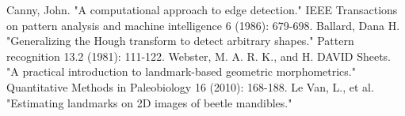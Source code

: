 \documentclass[twoside,twocolumn,10pt]{article}
\begin{document}

\begin{thebibliography}{99}
\label{references}
 Canny, John. "A computational approach to edge detection." IEEE Transactions on pattern analysis and machine intelligence 6 (1986): 679-698.
 Ballard, Dana H. "Generalizing the Hough transform to detect arbitrary shapes." Pattern recognition 13.2 (1981): 111-122.
 Webster, M. A. R. K., and H. DAVID Sheets. "A practical introduction to landmark-based geometric morphometrics." Quantitative Methods in Paleobiology 16 (2010): 168-188.
 Le Van, L., et al. "Estimating landmarks on 2D images of beetle mandibles."
\end{thebibliography}


\end{document}

